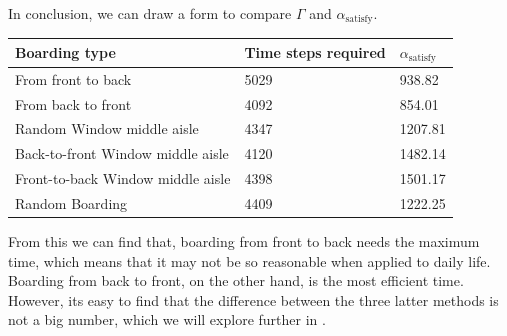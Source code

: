\documentclass{article}
\theoremstyle{definition}
\theoremstyle{remark}
\numberwithin{equation}{section}
\begin{document}
	In conclusion, we can draw a form to compare $\Gamma$ and $\alpha_\text{satisfy}$.

	\begin{center}
	\begin{tabular}{||l|l|l||}
		\hline
		Boarding type&Time steps required&$\alpha_\text{satisfy}$\\
		\hline
		From front to back&5029&938.82\\
		From back to front&4092&854.01\\
		Random Window middle aisle&4347&1207.81\\
		Back-to-front Window middle aisle&4120&1482.14\\
		Front-to-back Window middle aisle&4398&1501.17\\
		Random Boarding&4409&1222.25\\
		\hline
	\end{tabular}
	\end{center}
	From this we can find that, boarding from front to back needs the maximum time, which means that it may not be so reasonable when applied to daily life. Boarding from back to front, on the other hand, is the most  efficient time. However, its easy to find that the difference between the three latter methods is not a big number, which we will explore further in .
\end{document}

